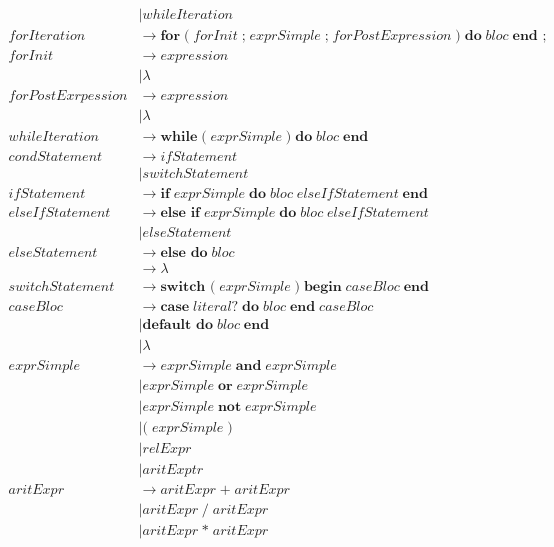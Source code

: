 \documentclass{article}
\begin{document}
\begin{align*}
			&\mid whileIteration \\
		forIteration &\rightarrow \textbf{for} \; \textbf{(} \; forInit \; \textbf{;} \; exprSimple \; \textbf{;} \; forPostExpression \; \textbf{)} \; \textbf{do} \; bloc \; \textbf{end ;} \\
		forInit &\rightarrow expression \\
			&\mid \lambda \\
		forPostExrpession &\rightarrow expression \\
			&\mid \lambda \\
		whileIteration &\rightarrow \textbf{while} \; \textbf{(} \; exprSimple \; \textbf{)} \; \textbf{do} \; bloc \; \textbf{end} \\
		condStatement &\rightarrow ifStatement \\
			&\mid switchStatement	 \\
		ifStatement &\rightarrow \textbf{if} \; exprSimple \; \textbf{do} \; bloc \; elseIfStatement \; \textbf{end} \\
		elseIfStatement &\rightarrow \textbf{else if} \; exprSimple \; \textbf{do} \; bloc \; elseIfStatement \\
			&\mid elseStatement \\
		elseStatement &\rightarrow \textbf{else do} \; bloc \\
			&\rightarrow \lambda \\
		switchStatement &\rightarrow \textbf{switch (}  \;  exprSimple \; \textbf{)} \; \textbf{begin} \; caseBloc \; \textbf{end} \\
		caseBloc &\rightarrow \textbf{case} \; literal? \; \textbf{do} \; bloc \; \textbf{end} \; caseBloc \\
			&\mid \textbf{default do} \; bloc \; \textbf{end} \\
			&\mid \lambda \\
		exprSimple &\rightarrow exprSimple \; \textbf{and} \; exprSimple \\
			&\mid exprSimple \; \textbf{or} \; exprSimple \\
			&\mid exprSimple \; \textbf{not} \; exprSimple \\
			&\mid \textbf{(} \; exprSimple \; \textbf{)} \\
			&\mid relExpr \\
			&\mid aritExptr \\
		aritExpr &\rightarrow aritExpr \; \textbf{+} \; aritExpr \\
			&\mid aritExpr \; \textbf{/} \; aritExpr \\
			&\mid aritExpr \; \textbf{*} \; aritExpr \\

\end{align*}
\end{document}
